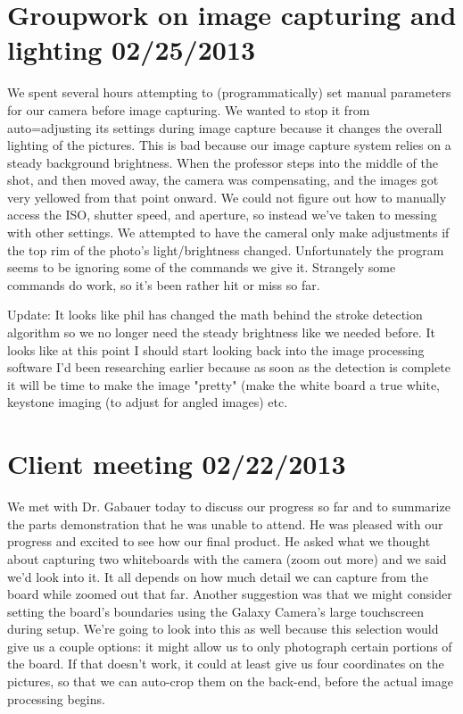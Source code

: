 \documentclass[]{article}
\begin{document}
	\tableofcontents
	\newpage
	
	\section{Groupwork on image capturing and lighting 02/25/2013}
	
	We spent several hours attempting to (programmatically) set manual parameters for our camera before image capturing. We wanted to stop it from auto=adjusting its settings during image capture because it changes the overall lighting of the pictures. This is bad because our image capture system relies on a steady background brightness. When the professor steps into the middle of the shot, and then moved away, the camera was compensating, and the images got very yellowed from that point onward. We could not figure out how to manually access the ISO, shutter speed, and aperture, so instead we've taken to messing with other settings. We attempted to have the cameral only make adjustments if the top rim of the photo's light/brightness changed. Unfortunately the program seems to be ignoring some of the commands we give it. Strangely some commands do work, so it's been rather hit or miss so far.
	
	Update: It looks like phil has changed the math behind the stroke detection algorithm so we no longer need the steady brightness like we needed before. It looks like at this point I should start looking back into the image processing software I'd been researching earlier because as soon as the detection is complete it will be time to make the image "pretty" (make the white board a true white, keystone imaging (to adjust for angled images) etc.
	
	
	\section{Client meeting 02/22/2013}
	
	We met with Dr. Gabauer today to discuss our progress so far and to summarize the parts demonstration that he was unable to attend. He was pleased with our progress and excited to see how our final product. He asked what we thought about capturing two whiteboards with the camera (zoom out more) and we said we'd look into it. It all depends on how much detail we can capture from the board while zoomed out that far. Another suggestion was that we might consider setting the board's boundaries using the Galaxy Camera's large touchscreen during setup. We're going to look into this as well because this selection would give us a couple options: it might allow us to only photograph certain portions of the board. If that doesn't work, it could at least give us four coordinates on the pictures, so that we can auto-crop them on the back-end, before the actual image processing begins.
	
\end{document}
